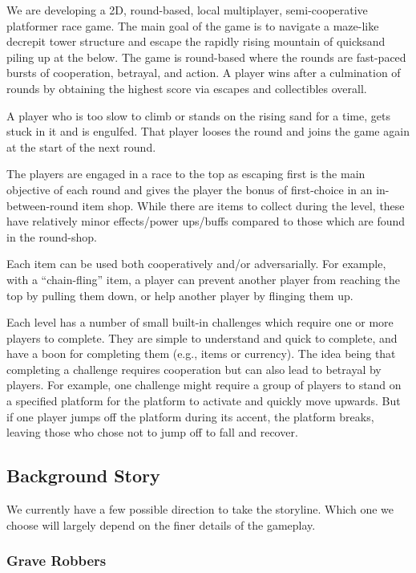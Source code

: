 We are developing a 2D, round-based, local multiplayer, semi-cooperative platformer race game. The main goal of the game is to navigate a maze-like decrepit tower structure and escape the rapidly rising mountain of quicksand piling up at the below. The game is round-based where the rounds are fast-paced bursts of cooperation, betrayal, and action. A player wins after a culmination of rounds by obtaining the highest score via escapes and collectibles overall.

A player who is too slow to climb or stands on the rising sand for a time, gets stuck in it and is engulfed. That player looses the round and joins the game again at the start of the next round.

The players are engaged in a race to the top as escaping first is the main objective of each round and gives the player the bonus of first-choice in an in-between-round item shop. While there are items to collect during the level, these have relatively minor effects/power ups/buffs compared to those which are found in the round-shop.

Each item can be used both cooperatively and/or adversarially. For example, with a ``chain-fling'' item, a player can prevent another player from reaching the top by pulling them down, or help another player by flinging them up.

Each level has a number of small built-in challenges which require one or more players to complete. They are simple to understand and quick to complete, and have a boon for completing them (e.g., items or currency). The idea being that completing a challenge requires cooperation but can also lead to betrayal by players. For example, one challenge might require a group of players to stand on a specified platform for the platform to activate and quickly move upwards. But if one player jumps off the platform during its accent, the platform breaks, leaving those who chose not to jump off to fall and recover.

\subsection{Background Story}

We currently have a few possible direction to take the storyline. Which one we choose will largely depend on the finer details of the gameplay.

\subsubsection{Grave Robbers}

